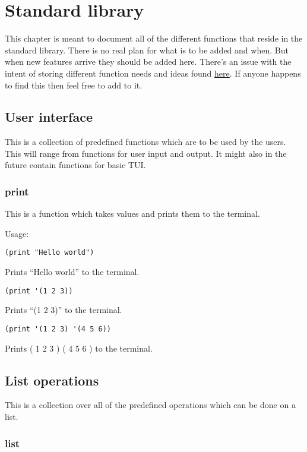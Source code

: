 
\section{Standard library}

This chapter is meant to document all of the different functions that reside in the standard library. 
There is no real plan for what is to be added and when. 
But when new features arrive they should be added here. 
There's an issue with the intent of storing different function needs and ideas found \href{https://github.com/AntonJoha/Lisp/issues/11}{here}.
If anyone happens to find this then feel free to add to it. 


\subsection{User interface}

This is a collection of predefined functions which are to be used by the users. 
This will range from functions for user input and output. 
It might also in the future contain functions for basic TUI. 


\subsubsection{print}

This is a function which takes values and prints them to the terminal.

Usage:
\begin{lstlisting}
(print "Hello world")
\end{lstlisting}
Prints ``Hello world'' to the terminal.
\begin{lstlisting}
(print '(1 2 3))
\end{lstlisting}
Prints ``(1 2 3)'' to the terminal.
\begin{lstlisting}
(print '(1 2 3) '(4 5 6))
\end{lstlisting}
Prints ( 1 2 3 ) ( 4 5 6 ) to the terminal.

\subsection{List operations}

This is a collection over all of the predefined operations which can be done on a list.

\subsubsection{list}

